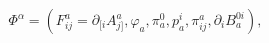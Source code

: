 \begin{equation}
\Phi ^{\alpha }=\left( F_{ij}^{a}=\partial _{[i}A_{j]}^{a},\varphi _{a},\pi
_{a}^{0},p_{a}^{i},\pi _{ij}^{a},\partial _{i}B_{a}^{0i}\right) ,  \label{c3}
\end{equation}

